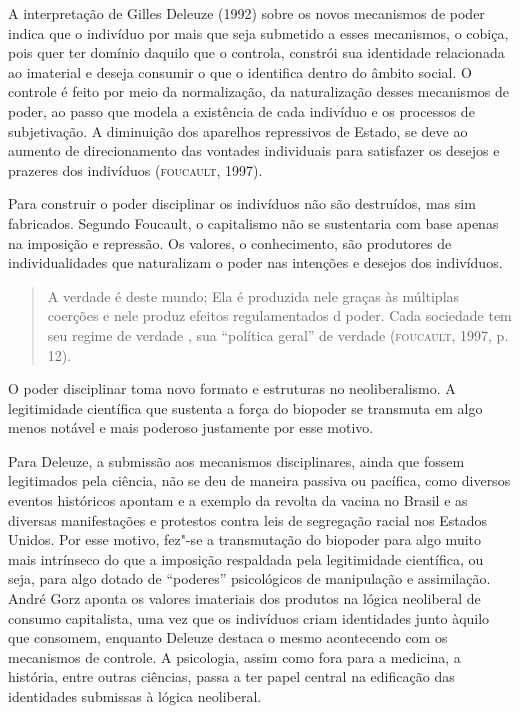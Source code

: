 A interpretação de Gilles Deleuze (1992) sobre os novos mecanismos de
poder indica que o indivíduo por mais que seja submetido a esses
mecanismos, o cobiça, pois quer ter domínio daquilo que o controla,
constrói sua identidade relacionada ao imaterial e deseja consumir o que
o identifica dentro do âmbito social. O controle é feito por meio da
normalização, da naturalização desses mecanismos de poder, ao passo que
modela a existência de cada indivíduo e os processos de subjetivação. A
diminuição dos aparelhos repressivos de Estado, se deve ao aumento de
direcionamento das vontades individuais para satisfazer os desejos e
prazeres dos indivíduos (\textsc{foucault}, 1997).

Para construir o poder disciplinar os indivíduos não são destruídos,
mas sim fabricados. Segundo Foucault, o capitalismo não se sustentaria
com base apenas na imposição e repressão. Os valores, o conhecimento,
são produtores de individualidades que naturalizam o poder nas intenções
e desejos dos indivíduos.

\begin{quote}
A verdade é deste mundo; Ela é produzida nele graças às múltiplas
coerções e nele produz efeitos regulamentados d poder. Cada sociedade
tem seu regime de verdade , sua ``política geral'' de verdade
(\textsc{foucault}, 1997, p. 12).
\end{quote}

O poder disciplinar toma novo formato e estruturas no neoliberalismo. A
legitimidade científica que sustenta a força do biopoder se transmuta em
algo menos notável e mais poderoso justamente por esse motivo.

Para Deleuze, a submissão aos mecanismos disciplinares, ainda que fossem
legitimados pela ciência, não se deu de maneira passiva ou pacífica,
como diversos eventos históricos apontam e a exemplo da revolta da
vacina no Brasil e as diversas manifestações e protestos contra leis de
segregação racial nos Estados Unidos. Por esse motivo, fez"-se a
transmutação do biopoder para algo muito mais intrínseco do que a
imposição respaldada pela legitimidade científica, ou seja, para algo
dotado de ``poderes'' psicológicos de manipulação e assimilação. André
Gorz aponta os valores imateriais dos produtos na lógica neoliberal de
consumo capitalista, uma vez que os indivíduos criam identidades junto
àquilo que consomem, enquanto Deleuze destaca o mesmo acontecendo com os
mecanismos de controle. A psicologia, assim como fora para a medicina, a
história, entre outras ciências, passa a ter papel central na edificação
das identidades submissas à lógica neoliberal.


